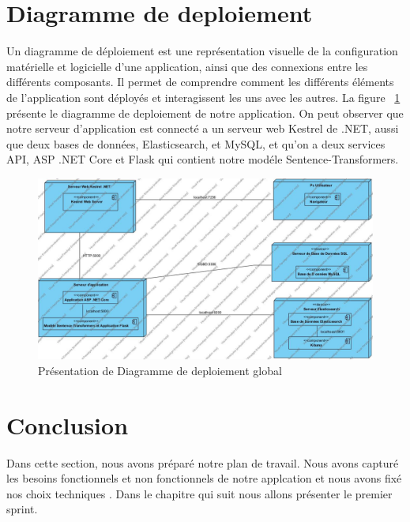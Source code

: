\newpage
\section{Diagramme de deploiement}
\noindent
Un diagramme de déploiement est une représentation visuelle de la configuration
matérielle et logicielle d'une application, ainsi que des connexions entre les différents composants. Il permet de comprendre comment les différents éléments de l'application sont déployés et interagissent les uns avec les autres. La figure ~\ref{fig:diagdepglobal} présente le diagramme de deploiement de notre application. On peut observer que notre serveur d'application est connecté a un serveur web Kestrel de .NET, aussi que deux bases de données, Elasticsearch, et MySQL, et qu'on a deux services API, ASP .NET Core et Flask qui contient notre modéle Sentence-Transformers.


\begin{figure}[H]
\centering
\includegraphics[width=1\textwidth]{logos/deployment.png}
\caption{Présentation de Diagramme de deploiement global}
\label{fig:diagdepglobal}
\end{figure}


\section{Conclusion}
\noindent
Dans cette section, nous avons préparé notre plan de travail. Nous avons capturé les besoins fonctionnels et non fonctionnels de notre applcation et nous avons fixé nos choix techniques .
Dans le chapitre qui suit nous allons présenter le premier sprint. 